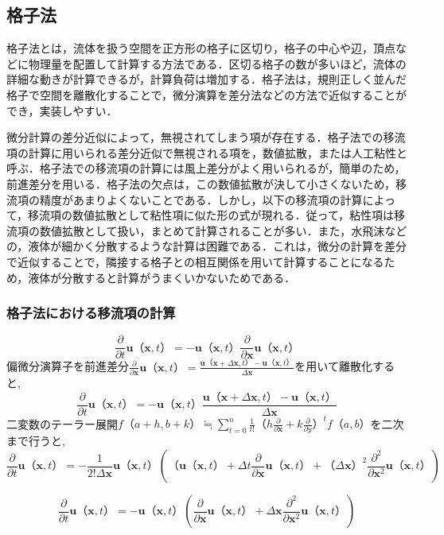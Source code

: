 \documentclass[a4j,12pt]{jreport}
\begin{document}
\subsection{格子法} \label{subsec:grid}
格子法とは，流体を扱う空間を正方形の格子に区切り，格子の中心や辺，頂点などに物理量を配置して計算する方法である．区切る格子の数が多いほど，流体の詳細な動きが計算できるが，計算負荷は増加する．格子法は，規則正しく並んだ格子で空間を離散化することで，微分演算を差分法などの方法で近似することができ，実装しやすい．

微分計算の差分近似によって，無視されてしまう項が存在する．格子法での移流項の計算に用いられる差分近似で無視される項を，数値拡散，または人工粘性と呼ぶ．格子法での移流項の計算には風上差分がよく用いられるが，簡単のため，前進差分を用いる．格子法の欠点は，この数値拡散が決して小さくないため，移流項の精度があまりよくないことである．しかし，以下の移流項の計算によって，移流項の数値拡散として粘性項に似た形の式が現れる．従って，粘性項は移流項の数値拡散として扱い，まとめて計算されることが多い．また，水飛沫などの，液体が細かく分散するような計算は困難である．これは，微分の計算を差分で近似することで，隣接する格子との相互関係を用いて計算することになるため，液体が分散すると計算がうまくいかないためである．

\subsubsection{格子法における移流項の計算} \label{subsec:gridadvect}
$$\frac{\partial}{\partial t}\bm{u}（\bm{x},t） = -\bm{u}（\bm{x},t）\frac{\partial}{\partial \bm{x}}\bm{u}（\bm{x},t）$$
偏微分演算子を前進差分$\frac{\partial}{\partial \bm{x}}\bm{u}（\bm{x},t） = \frac{\bm{u}（\bm{x}+\varDelta \bm{x},t） - \bm{u}（\bm{x},t）}{\varDelta \bm{x}}$を用いて離散化すると,
$$\frac{\partial}{\partial t}\bm{u}（\bm{x},t） =  -\bm{u}（\bm{x},t）\frac{\bm{u}（\bm{x}+\varDelta \bm{x},t） - \bm{u}（\bm{x},t）}{\varDelta \bm{x}}$$
二変数のテーラー展開$f（a+h,b+k） \fallingdotseq \sum\limits_{t=0}^n \frac{1}{t!}（h\frac{\partial}{\partial \bm{x}} + k\frac{\partial}{\partial y}）^t f（a,b）$を二次まで行うと,
$$\frac{\partial}{\partial t}\bm{u}（\bm{x},t） = -\frac{1}{2!\varDelta \bm{x}}\bm{u}（\bm{x},t）\left( （\bm{u}（\bm{x},t）+\varDelta t\frac{\partial}{\partial \bm{x}}\bm{u}（\bm{x},t） + （\varDelta \bm{x}）^2\frac{\partial^2}{\partial \bm{x}^2}\bm{u}（\bm{x},t） \right)$$
            
$$\frac{\partial}{\partial t}\bm{u}（\bm{x},t） =  -\bm{u}（\bm{x},t）\left(\frac{\partial}{\partial \bm{x}}\bm{u}（\bm{x},t） + \varDelta \bm{x}\frac{\partial^2}{\partial \bm{x}^2}\bm{u}（\bm{x},t） \right)$$
\end{document}
